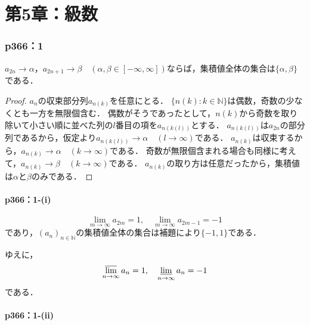 \documentclass[a4paper,10pt,fleqn]{ltjsarticle}
\begin{document}
\newpage

\part*{第5章：級数}


\section*{p366：1}


$a_{2n} \to \alpha$，$a_{2n+1} \to \beta$$\quad (\alpha,\beta \in [-\infty,\infty])$ならば，集積値全体の集合は$\{\alpha,\beta\}$である．

    \begin{proof}
        $a_n$の収束部分列$a_{n(k)}$を任意にとる．
        $\{n(k):k \in \mathbb{N}\}$は偶数，奇数の少なくとも一方を無限個含む．
        偶数がそうであったとして，$n(k)$から奇数を取り除いて小さい順に並べた列の$l$番目の項を$a_{n(k(l))}$とする．
        $a_{n(k(l))}$は$a_{2n}$の部分列であるから，仮定より$a_{n(k(l))} \to \alpha \quad (l \to \infty)$である．
        $a_{n(k)}$は収束するから，$a_{n(k)} \to \alpha \quad (k \to \infty)$である．
        奇数が無限個含まれる場合も同様に考えて，$a_{n(k)} \to \beta \quad (k \to \infty)$である．
        $a_{n(k)}$の取り方は任意だったから，集積値は$\alpha$と$\beta$のみである．
    \end{proof}

    \subsection*{p366：1-(i)}

    \begin{tleftbar}
        \[
            \lim_{m \to \infty} a_{2m} = 1 , \quad \lim_{m \to \infty} a_{2m-1} = -1
        \]
        であり，$(a_n)_{n \in \mathbb{N}}$の集積値全体の集合は補題により$\{ -1 , 1 \}$である．

        ゆえに，
        \[
            \varlimsup_{n \to \infty} a_n = 1 , \quad \varliminf_{n \to \infty} a_n =-1
        \]
        である．
    \end{tleftbar}


    \subsection*{p366：1-(ii)}
\end{document}
